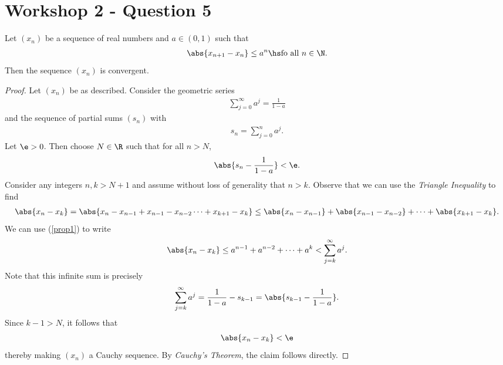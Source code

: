 \documentclass{article}
\begin{document}
\section{Workshop 2 - Question 5}

\begin{claim}
   Let $(x_n)$ be a sequence of real numbers and $a\in(0,1)$ such that
   \begin{align}
      \label{prop1}
      \abs{x_{n+1}-x_n} \leq a^n\hs\text{fo all }n\in\N.
   \end{align}
   Then the sequence $(x_n)$ is convergent.
\end{claim}
\begin{proof}
   Let $(x_n)$ be as described. Consider the geometric series
   \begin{align*}
      \sum_{j=0}^\infty a^j = \frac{1}{1-a}
   \end{align*}
   and the sequence of partial sums $(s_n)$ with
   \begin{align*}
      s_n = \sum_{j=0}^n a^j.
   \end{align*}
   Let $\e>0$. Then choose $N\in\R$ such that for all $n>N$,
   \begin{align*}
      \abs{s_n-\frac{1}{1-a}} < \e.
   \end{align*}
   Consider any integers $n,k>N+1$ and assume without loss of generality that $n>k$.
   Observe that we can use the \emph{Triangle Inequality} to find
   \begin{align*}
      \abs{x_n - x_k} = \abs{x_n - x_{n-1} + x_{n-1} - x_{n-2} \cdots + x_{k+1} - x_k}
      \leq \abs{x_n-x_{n-1}} + \abs{x_{n-1} - x_{n-2}} + \cdots + \abs{x_{k+1} - x_k}.
   \end{align*}
   We can use (\ref{prop1}) to write
   \begin{align*}
      \abs{x_n - x_k} \leq a^{n-1} + a^{n-2} + \cdots + a^k < \sum_{j=k}^\infty a^j.
   \end{align*}
   Note that this infinite sum is precisely
   \begin{align*}
      \sum_{j=k}^\infty a^j = \frac{1}{1-a}-s_{k-1}=\abs{s_{k-1}-\frac{1}{1-a}}.
   \end{align*}
   Since $k-1>N$, it follows that
   \begin{align*}
      \abs{x_n - x_k} < \e
   \end{align*}
   thereby making $(x_n)$ a Cauchy sequence. By \emph{Cauchy's Theorem}, the claim follows directly.
\end{proof}
\end{document}
